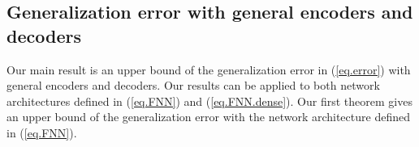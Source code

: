 \documentclass[11pt]{article} %
\newcommand{\hz}[1]{{\color{blue} HZ: #1}}
\begin{document}
\subsection{Generalization error with general encoders and decoders}
\label{sec.mainresults.error}


Our main result is an upper bound of the generalization error in (\ref{eq.error}) with general encoders and decoders. Our results can be applied to both network architectures defined in (\ref{eq.FNN}) and (\ref{eq.FNN.dense}). %
Our first theorem gives an upper bound of the generalization error with the network architecture defined in (\ref{eq.FNN}).

\end{document}

